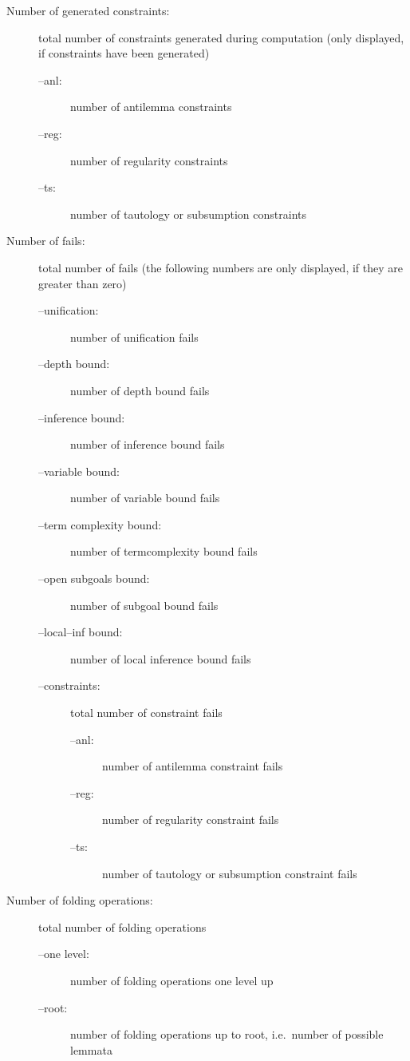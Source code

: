 \begin{description}
\item[Number of generated constraints:]
     total number of constraints generated during computation (only
     displayed, if constraints have been generated)
     \begin{description}
     \item [--anl:] number of antilemma constraints
     \item [--reg:] number of regularity constraints
     \item [--ts:] number of tautology or subsumption constraints 
     \end{description}
     
\item[Number of fails:]
     total number of fails (the following numbers are only displayed,
     if they are greater than zero) 
     \begin{description}
     \item [--unification:] number of unification fails
     \item [--depth bound:] number of depth bound fails
     \item [--inference bound:] number of inference bound fails
     \item [--variable bound:] number of variable bound fails
     \item [--term complexity bound:] number of termcomplexity bound
                                      fails 
     \item [--open subgoals bound:] number of subgoal bound fails
     \item [--local--inf bound:] number of local inference bound fails
     \item [--constraints:]
           total number of constraint fails
          \begin{description}
          \item [--anl:] number of antilemma constraint fails
          \item [--reg:] number of regularity constraint fails
          \item [--ts:] number of tautology or subsumption constraint
                       fails 
          \end{description}
     \end{description}
     
\item[Number of folding operations:]
     total number of folding operations
     \begin{description}
     \item [--one level:] number of folding operations one level up
     \item [--root:] number of folding operations up to root, i.e.\
                     number of possible lemmata 
     \end{description}
     

\end{description}
